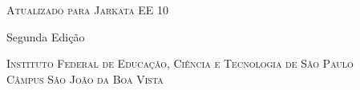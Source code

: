 {
    \thispagestyle{empty}
    
    \center
    
    \vspace*{4.5cm}
    \noindent
    \chaptitlefont\HUGE\textsc{\thetitle}
    
    {\chaptitlefont\large\textsc{Atualizado para Jarkata EE 10}}
    
    {\normalsize Segunda Edição}
    
    \vspace{4.5cm}
    \noindent
    \chaptitlefont\Large\textsc{\theauthor}
    
    \chaptitlefont\tiny\textsc{Instituto Federal de Educação, Ciência e Tecnologia de São Paulo}\\
    \chaptitlefont\tiny\textsc{Câmpus São João da Boa Vista}
        
    \vfill
    \restoregeometry
}